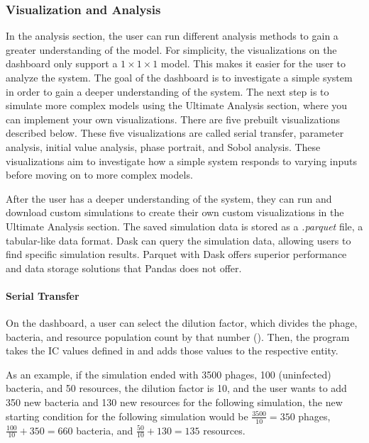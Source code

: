 \subsubsection{Visualization and Analysis}
In the analysis section, the user can run different analysis methods to gain a greater understanding of the model.
For simplicity, the visualizations on the dashboard only support a $1 \times 1\times 1$ model. 
This makes it easier for the user to analyze the system. 
The goal of the dashboard is to investigate a simple system in order to gain a deeper understanding of the system. 
The next step is to simulate more complex models using the Ultimate Analysis section, where you can implement your own visualizations. 
There are five prebuilt visualizations described below. 
These five visualizations are called serial transfer, parameter analysis, initial value analysis, phase portrait, and Sobol analysis. 
These visualizations aim to investigate how a simple system responds to varying inputs before moving on to more complex models. 

After the user has a deeper understanding of the system, they can run and download custom simulations to create their own custom visualizations in the Ultimate Analysis section. 
The saved simulation data is stored as a \textit{.parquet} file, a tabular-like data format. 
Dask can query the simulation data, allowing users to find specific simulation results. 
Parquet with Dask offers superior performance and data storage solutions that Pandas does not offer.

\paragraph{Serial Transfer}
\label{sec:serial_transfer}
On the dashboard, a user can select the dilution factor, which divides the phage, bacteria, and resource population count by that number ().
Then, the program takes the IC values defined in  and adds those values to the respective entity. 

As an example, if the simulation ended with 3500 phages, 100 (uninfected) bacteria, and 50 resources, the dilution factor is 10, and the user wants to add 350 new bacteria and 130 new resources for the following simulation, the new starting condition for the following simulation would be $\frac{3500}{10} = 350$ phages, $\frac{100}{10} + 350 = 660$ bacteria, and $\frac{50}{10} + 130 = 135$ resources.

